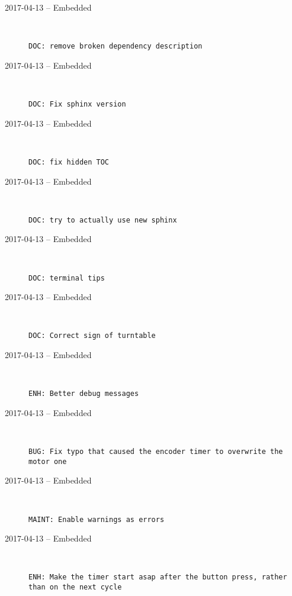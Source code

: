 \begin{description}
  \item[2017-04-13 -- Embedded] \hfill \
\begin{lstlisting}
DOC: remove broken dependency description
\end{lstlisting}


  \item[2017-04-13 -- Embedded] \hfill \
\begin{lstlisting}
DOC: Fix sphinx version
\end{lstlisting}


  \item[2017-04-13 -- Embedded] \hfill \
\begin{lstlisting}
DOC: fix hidden TOC
\end{lstlisting}


  \item[2017-04-13 -- Embedded] \hfill \
\begin{lstlisting}
DOC: try to actually use new sphinx
\end{lstlisting}


  \item[2017-04-13 -- Embedded] \hfill \
\begin{lstlisting}
DOC: terminal tips
\end{lstlisting}


  \item[2017-04-13 -- Embedded] \hfill \
\begin{lstlisting}
DOC: Correct sign of turntable
\end{lstlisting}


  \item[2017-04-13 -- Embedded] \hfill \
\begin{lstlisting}
ENH: Better debug messages
\end{lstlisting}


  \item[2017-04-13 -- Embedded] \hfill \
\begin{lstlisting}
BUG: Fix typo that caused the encoder timer to overwrite the motor one
\end{lstlisting}


  \item[2017-04-13 -- Embedded] \hfill \
\begin{lstlisting}
MAINT: Enable warnings as errors
\end{lstlisting}


  \item[2017-04-13 -- Embedded] \hfill \
\begin{lstlisting}
ENH: Make the timer start asap after the button press, rather than on the next cycle


\end{lstlisting}
\end{description}
